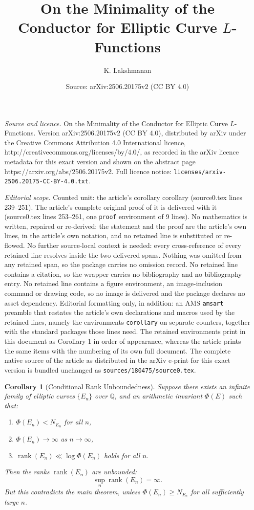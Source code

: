 \documentclass[10pt,a4paper]{amsart}
\title{On the Minimality of the Conductor for Elliptic Curve $L$-Functions}
\author{K. Lakshmanan}
\date{Source: arXiv:2506.20175v2 (CC BY 4.0)}
\newtheorem{corollary}{Corollary}
\begin{document}
\maketitle

\noindent\emph{Source and licence.} On the Minimality of the Conductor for Elliptic Curve $L$-Functions. Version arXiv:2506.20175v2 (CC BY 4.0), distributed by arXiv under the Creative Commons Attribution 4.0 International licence, http://creativecommons.org/licenses/by/4.0/, as recorded in the arXiv licence metadata for this exact version and shown on the abstract page https://arxiv.org/abs/2506.20175v2. Full licence notice: \texttt{licenses/arxiv-2506.20175-CC-BY-4.0.txt}.\par\smallskip

\noindent\textit{Editorial scope.} Counted unit: the article's corollary corollary (source0.tex lines 239--251). The article's complete original proof of it is delivered with it (source0.tex lines 253--261, one \texttt{proof} environment of 9 lines). No mathematics is written, repaired or re-derived: the statement and the proof are the article's own lines, in the article's own notation, and no retained line is substituted or re-flowed.  No further source-local context is needed: every cross-reference of every retained line resolves inside the two delivered spans.  Nothing was omitted from any retained span, so the package carries no omission record.  No retained line contains a citation, so the wrapper carries no bibliography and no bibliography entry.  No retained line contains a figure environment, an image-inclusion command or drawing code, so no image is delivered and the package declares no asset dependency.  Editorial formatting only, in addition: an AMS \texttt{amsart} preamble that restates the article's own declarations and macros used by the retained lines, namely the environments \texttt{corollary} on separate counters, together with the standard packages those lines need.  The retained environments print in this document as Corollary 1 in order of appearance, whereas the article prints the same items with the numbering of its own full document.  The complete native source of the article as distributed in the arXiv e-print for this exact version is bundled unchanged as \texttt{sources/180475/source0.tex}.
	\begin{corollary}[Conditional Rank Unboundedness]
		Suppose there exists an infinite family of elliptic curves \( \{E_n\} \) over \( \mathbb{Q} \), and an arithmetic invariant \( \Phi(E) \) such that:
		\begin{enumerate}
			\item \( \Phi(E_n) < N_{E_n} \) for all \( n \),
			\item \( \Phi(E_n) \to \infty \) as \( n \to \infty \),
			\item \( \operatorname{rank}(E_n) \ll \log \Phi(E_n) \) holds for all \( n \).
		\end{enumerate}
		Then the ranks \( \operatorname{rank}(E_n) \) are unbounded:
		\[
		\sup_n \operatorname{rank}(E_n) = \infty.
		\]
		But this contradicts the main theorem, unless \( \Phi(E_n) \ge N_{E_n} \) for all sufficiently large \( n \).
	\end{corollary}
\end{document}

